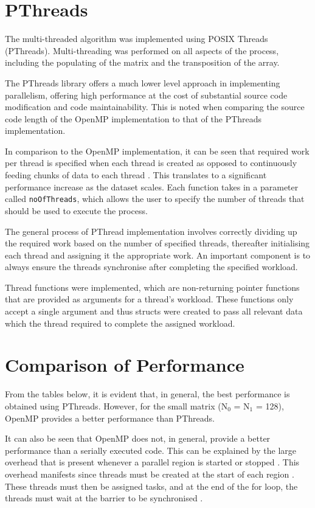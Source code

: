 \documentclass[10pt,twocolumn]{witseiepaper}
\begin{document}
\section{PThreads}
The multi-threaded algorithm was implemented using POSIX Threads (PThreads). Multi-threading was performed on all aspects of the process, including the populating of the matrix and the transposition of the array. 

The PThreads library offers a much lower level approach in implementing parallelism, offering high performance at the cost of substantial source code modification and code maintainability. This is noted when comparing the source code length of the OpenMP implementation to that of the PThreads implementation.

In comparison to the OpenMP implementation, it can be seen that required work per thread is specified when each thread is created as opposed to continuously feeding chunks of data to each thread \cite{pthread}. This translates to a significant performance increase as the dataset scales. Each function takes in a parameter called \texttt{noOfThreads}, which allows the user to specify the number of threads that should be used to execute the process.

The general process of PThread implementation involves correctly dividing up the required work based on the number of specified threads, thereafter initialising each thread and assigning it the appropriate work. An important component is to always ensure the threads synchronise after completing the specified workload.

Thread functions were implemented, which are non-returning pointer functions that are provided as arguments for a thread's workload. These functions only accept a single argument and thus structs were created to pass all relevant data which the thread required to complete the assigned workload.

\section{Comparison of Performance}
From the tables below, it is evident that, in general, the best performance is obtained using PThreads. However, for the small matrix (N$_{0}$ = N$_{1}$ = 128), OpenMP provides a better performance than PThreads. 

It can also be seen that OpenMP does not, in general, provide a better performance than a serially executed code. This can be explained by the large overhead that is present whenever a parallel region is started or stopped \cite{HPC}. This overhead manifests since threads must be created at the start of each region \cite{HPC}. These threads must then be assigned tasks, and at the end of the for loop, the threads must wait at the barrier to be synchronised \cite{HPC}.
\end{document}
